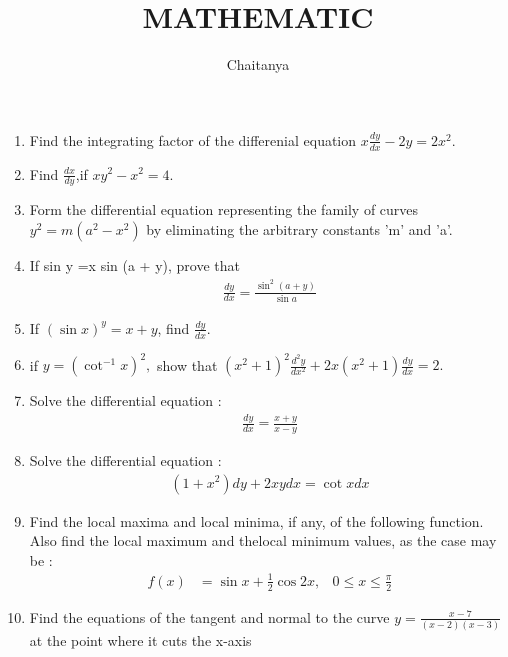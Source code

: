 \documentclass[12pt,-letter paper]{article}
\title{\textbf{MATHEMATIC}}
\author{Chaitanya}
\begin{document}
\maketitle
\begin{enumerate}
\section{\textbf{Differentiations}}
\item Find the integrating factor of the differenial equation $x \frac{d
    y}{dx} - 2y = 2x^2.$
\item Find $\frac{dx}{dy}$,if $xy^2-x^2 = 4$.
\item Form the differential equation representing the family of curves $y^2 = m(a^2 - x^2)$ by eliminating the arbitrary constants 'm' and 'a'.
\item If sin y =x sin (a + y), prove that
\begin{align*}
     \frac{dy}{dx} = \frac{\sin^{2}(a+y)}{\sin a}
\end{align*}
\item If $(\sin x)^y = x + y$, find $\frac{dy}{dx}.$
\item if $y = {(\cot^{-1}x)^2},$ show that ${(x^2 + 1)}^{2}\frac{d^{2}y}{dx^{2}} + 2x{(x^2 + 1)}\frac{dy}{dx} = 2.$
\item Solve the differential equation :
\begin{align*}
	\frac{dy}{dx} = \frac{x + y}{x - y}
\end{align*}
\item Solve the differential equation :
\begin{align*}
	(1 + x^{2})dy + 2xy dx = \cot x dx
\end{align*}
\item Find the local maxima and local minima, if any, of the following function. Also find the local maximum and thelocal minimum values, as the case may be :
	\begin{align*}
		f(x) &= \sin x + \frac{1}{2} \cos 2x, & 0 \leq x \leq \frac{\pi}{2}
	\end{align*}
\item Find the equations of the tangent and normal to the 
curve $y = \frac{x - 7}{(x - 2)(x - 3)}$ at the point where it cuts the x-axis
\end{enumerate}
\end{document}
